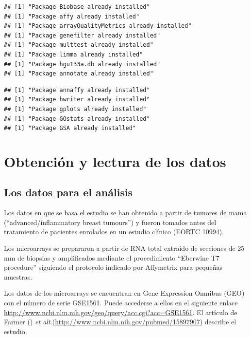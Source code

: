 \documentclass[a4paper]{article}\usepackage[]{graphicx}\usepackage[]{color}
\makeatletter
\newenvironment{kframe}{%
 \def\at@end@of@kframe{}%
 \ifinner\ifhmode%
  \def\at@end@of@kframe{\end{minipage}}%
  \begin{minipage}{\columnwidth}%
 \fi\fi%
 \def\FrameCommand##1{\hskip\@totalleftmargin \hskip-\fboxsep
 \colorbox{shadecolor}{##1}\hskip-\fboxsep
     \hskip-\linewidth \hskip-\@totalleftmargin \hskip\columnwidth}%
 \MakeFramed {\advance\hsize-\width
   \@totalleftmargin\z@ \linewidth\hsize
   \@setminipage}}%
 {\par\unskip\endMakeFramed%
 \at@end@of@kframe}
\newenvironment{knitrout}{}{} %
\newcommand{\etal}{{\it et alt.}}
\makeatother
\begin{document}
\begin{knitrout}
\color{fgcolor}\begin{kframe}
\begin{verbatim}
## [1] "Package Biobase already installed"
## [1] "Package affy already installed"
## [1] "Package arrayQualityMetrics already installed"
## [1] "Package genefilter already installed"
## [1] "Package multtest already installed"
## [1] "Package limma already installed"
## [1] "Package hgu133a.db already installed"
## [1] "Package annotate already installed"
\end{verbatim}


{\ttfamily\noindent\color{warningcolor}{\#\# Warning: Package 'KEGG.db' is deprecated and will be removed from Bioconductor\\\#\#\ \  version 3.12}}\begin{verbatim}
## [1] "Package annaffy already installed"
## [1] "Package hwriter already installed"
## [1] "Package gplots already installed"
## [1] "Package GOstats already installed"
## [1] "Package GSA already installed"
\end{verbatim}
\end{kframe}
\end{knitrout}


\section{Obtención y lectura de los datos}

\subsection{Los datos para el análisis}

Los datos en que se basa el estudio se han obtenido a partir de tumores de mama (``advanced/inflammatory breast tumours'') y fueron tomados antes del tratamiento de pacientes enrolados en un estudio clínico (EORTC 10994). 

Los microarrays se prepararon a partir de RNA total extraído de secciones de 25 mm de biopsias y amplificados mediante el procedimiento ``Eberwine T7 procedure'' siguiendo el protocolo indicado por Affymetrix para pequeñas muestras.

Los datos de los microarrays se encuentran en Gene Expression Omnibus (GEO) con el número de serie GSE1561. Puede accederse a ellos  en el siguiente enlace \url{http://www.ncbi.nlm.nih.gov/geo/query/acc.cgi?acc=GSE1561}. El artículo de Farmer (\cite{Farmer2005}) \etal (\url{http://www.ncbi.nlm.nih.gov/pubmed/15897907}) describe el estudio.
\end{document}
